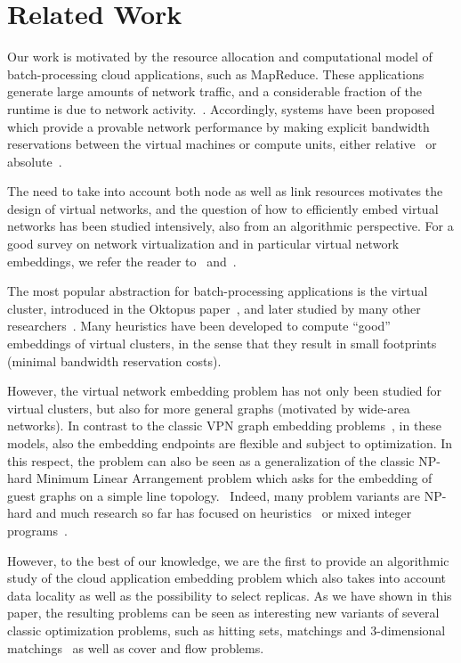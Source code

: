 \documentclass[9pt,twocolumn]{scrartcl}
\begin{document}
\section{Related Work}\label{sec:relwork}

Our work is motivated by the resource allocation and computational model of
batch-processing cloud applications, such as MapReduce. 
These applications 
generate large amounts of network traffic, and a considerable
fraction of the runtime is due to network acti\-vi\-ty.~\cite{talk-about,amazonbw,orchestra}.
Accordingly, systems have been proposed which provide
a provable network performance by making explicit bandwidth reservations
between the virtual machines or compute units, either relative~\cite{seawall,faircloud,elasticswitch} 
or absolute~\cite{secondnet,oktopus, proteus, drl, gatekeeper}. 

The need to take into account both node as well as link resources motivates
the design of virtual networks, and the question of how to efficiently embed virtual networks
has been studied intensively, also from an algorithmic perspective.
For a good survey on network virtualization and in particular virtual network embeddings,
we refer the reader to~\cite{boutaba-survey} and~\cite{fischer-survey}.

The most popular abstraction for batch-processing applications is the virtual cluster,
introduced in the Oktopus paper~\cite{oktopus}, and later studied by many other researchers~\cite{proteus}. 
Many heuristics have been developed to compute ``good'' embeddings of virtual clusters, in the sense that
they result in small footprints (minimal bandwidth reservation costs). 

However, the virtual network embedding problem has not only been studied for virtual clusters,
but also for more general graphs (motivated by wide-area networks). In contrast to the classic VPN 
graph embedding problems~\cite{gupta2001provisioning,Goyal2008},
in these models, also the embedding endpoints are flexible and subject to optimization. 
In this respect, the problem can also be seen as a generalization of the classic NP-hard Minimum Linear Arrangement problem which asks for the
embedding of guest graphs on a simple line topology.~\cite{mla,mla-survey,mla-feige}
Indeed, many problem variants are NP-hard and much research so far has focused on heuristics~\cite{ammar,zhu06,simannealing,turner}
or mixed integer programs~\cite{infocom2009,ucc12mip}.

However, to the best of our knowledge, we are the first to provide an algorithmic
study of the cloud application embedding problem which also takes into account
data locality as well as the possibility to select replicas. As we have shown in this paper,
the resulting problems can be seen as interesting new variants of several classic optimization
problems, such as hitting sets, matchings and 3-dimensional matchings~\cite{3SC-hard} as well as cover and flow problems.~\cite{korte2002combinatorial}
\end{document}
